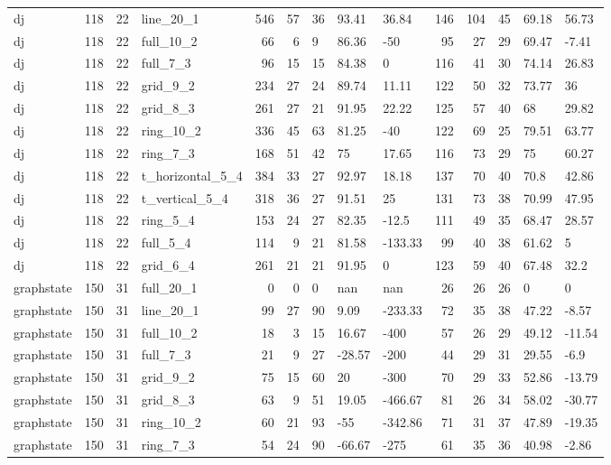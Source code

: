 \begin{longtable}{lrrlrrlllrrlll}
dj & 118 & 22 & line\_20\_1 & 546 & 57 & 36 & 93.41 & 36.84 & 146 & 104 & 45 & 69.18 & 56.73 \\
dj & 118 & 22 & full\_10\_2 & 66 & 6 & 9 & 86.36 & -50 & 95 & 27 & 29 & 69.47 & -7.41 \\
dj & 118 & 22 & full\_7\_3 & 96 & 15 & 15 & 84.38 & 0 & 116 & 41 & 30 & 74.14 & 26.83 \\
dj & 118 & 22 & grid\_9\_2 & 234 & 27 & 24 & 89.74 & 11.11 & 122 & 50 & 32 & 73.77 & 36 \\
dj & 118 & 22 & grid\_8\_3 & 261 & 27 & 21 & 91.95 & 22.22 & 125 & 57 & 40 & 68 & 29.82 \\
dj & 118 & 22 & ring\_10\_2 & 336 & 45 & 63 & 81.25 & -40 & 122 & 69 & 25 & 79.51 & 63.77 \\
dj & 118 & 22 & ring\_7\_3 & 168 & 51 & 42 & 75 & 17.65 & 116 & 73 & 29 & 75 & 60.27 \\
dj & 118 & 22 & t\_horizontal\_5\_4 & 384 & 33 & 27 & 92.97 & 18.18 & 137 & 70 & 40 & 70.8 & 42.86 \\
dj & 118 & 22 & t\_vertical\_5\_4 & 318 & 36 & 27 & 91.51 & 25 & 131 & 73 & 38 & 70.99 & 47.95 \\
dj & 118 & 22 & ring\_5\_4 & 153 & 24 & 27 & 82.35 & -12.5 & 111 & 49 & 35 & 68.47 & 28.57 \\
dj & 118 & 22 & full\_5\_4 & 114 & 9 & 21 & 81.58 & -133.33 & 99 & 40 & 38 & 61.62 & 5 \\
dj & 118 & 22 & grid\_6\_4 & 261 & 21 & 21 & 91.95 & 0 & 123 & 59 & 40 & 67.48 & 32.2 \\
graphstate & 150 & 31 & full\_20\_1 & 0 & 0 & 0 & nan & nan & 26 & 26 & 26 & 0 & 0 \\
graphstate & 150 & 31 & line\_20\_1 & 99 & 27 & 90 & 9.09 & -233.33 & 72 & 35 & 38 & 47.22 & -8.57 \\
graphstate & 150 & 31 & full\_10\_2 & 18 & 3 & 15 & 16.67 & -400 & 57 & 26 & 29 & 49.12 & -11.54 \\
graphstate & 150 & 31 & full\_7\_3 & 21 & 9 & 27 & -28.57 & -200 & 44 & 29 & 31 & 29.55 & -6.9 \\
graphstate & 150 & 31 & grid\_9\_2 & 75 & 15 & 60 & 20 & -300 & 70 & 29 & 33 & 52.86 & -13.79 \\
graphstate & 150 & 31 & grid\_8\_3 & 63 & 9 & 51 & 19.05 & -466.67 & 81 & 26 & 34 & 58.02 & -30.77 \\
graphstate & 150 & 31 & ring\_10\_2 & 60 & 21 & 93 & -55 & -342.86 & 71 & 31 & 37 & 47.89 & -19.35 \\
graphstate & 150 & 31 & ring\_7\_3 & 54 & 24 & 90 & -66.67 & -275 & 61 & 35 & 36 & 40.98 & -2.86 \\

\end{longtable}
